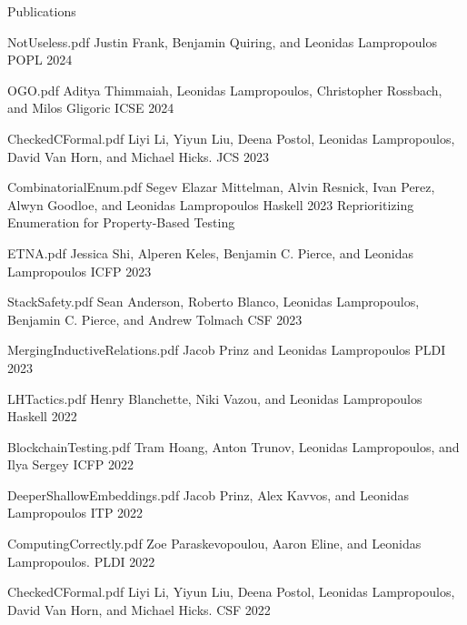 \documentclass{resume} %
\begin{document}
\begin{rSection}{Publications}

    {NotUseless.pdf}
    {Justin Frank, Benjamin Quiring, and Leonidas Lampropoulos}
    {POPL 2024}
  
    {OGO.pdf}
    {Aditya Thimmaiah, Leonidas Lampropoulos, Christopher Rossbach, and Milos Gligoric}
    {ICSE 2024}

    {CheckedCFormal.pdf}
    {Liyi Li, Yiyun Liu, Deena Postol, Leonidas Lampropoulos, David Van Horn, and Michael Hicks.}
    {JCS 2023}
    
    {CombinatorialEnum.pdf}
    {Segev Elazar Mittelman, Alvin Resnick, Ivan Perez, Alwyn Goodloe, and Leonidas Lampropoulos}
    {Haskell 2023}
    {Reprioritizing Enumeration for Property-Based Testing}
    
    {ETNA.pdf}
    {Jessica Shi, Alperen Keles, Benjamin C. Pierce, and Leonidas Lampropoulos}
    {ICFP 2023}

    {StackSafety.pdf}
    {Sean Anderson, Roberto Blanco, Leonidas Lampropoulos, Benjamin C. Pierce, and Andrew Tolmach}
    {CSF 2023}
  
    {MergingInductiveRelations.pdf}
    {Jacob Prinz and Leonidas Lampropoulos}
    {PLDI 2023}
  
    {LHTactics.pdf}
    {Henry Blanchette, Niki Vazou, and Leonidas Lampropoulos}
    {Haskell 2022}
  
    {BlockchainTesting.pdf}
    {Tram Hoang, Anton Trunov, Leonidas Lampropoulos, and Ilya Sergey}
    {ICFP 2022}
  
    {DeeperShallowEmbeddings.pdf}
    {Jacob Prinz, Alex Kavvos, and Leonidas Lampropoulos}
    {ITP 2022}
  
    {ComputingCorrectly.pdf}
    {Zoe Paraskevopoulou, Aaron Eline, and Leonidas Lampropoulos.}
    {PLDI 2022}
  
    {CheckedCFormal.pdf}
    {Liyi Li, Yiyun Liu, Deena Postol, Leonidas Lampropoulos, David Van Horn, and Michael Hicks.}
    {CSF 2022}


\end{rSection}
\end{document}
